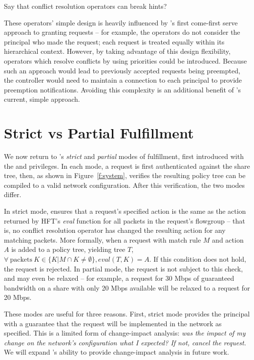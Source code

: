 {\color{red} Say that conflict resolution operators can break hints?}

These operators' simple design is heavily influenced by \sys's
first come-first serve approach to granting requests -- for example,
the operators do not consider the principal who made the request;
each request is treated equally within its hierarchical context.
However, by taking advantage of this design flexibility, operators
which resolve conflicts by using priorities could be introduced.
Because such an approach would lead to previously accepted requests
being preempted, the \sys controller would need to maintain a
connection to each principal to provide preemption notifications.
Avoiding this complexity is an additional benefit of \sys's current,
simple approach.

\section{Strict vs Partial Fulfillment}
\label{sec:strict-partial}

We now return to \sys's \emph{strict} and \emph{partial} modes of
fulfillment, first introduced with the  and 
privileges. In each mode, a request is first authenticated against the
share tree, then, as shown in Figure~\ref{f:system}, \sys verifies the resulting policy tree can be
compiled to a valid network configuration.
After this verification, the two modes differ.

In strict mode, \sys ensures that a request's specified action
is the same as the action returned by HFT's \emph{eval}
function for all packets in the request's flowgroup -- that is, no
conflict resolution operator has changed the resulting action for
any matching packets.
More formally, when a request with match rule $M$ and action
$A$ is added to a policy tree, yielding tree $T$,
$\forall\ \mathrm{packets}\ K \in \{ K | M \cap K \ne \emptyset \}, \mathit{eval} (T, K) = A$.
If this condition does not hold, the request is rejected.
In partial mode, the request is not subject to this check, and may
even be relaxed -- for example, a request for 30 Mbps of guaranteed
bandwidth on a share with only 20 Mbps available will be relaxed
to a request for 20 Mbps. 

These modes are useful for three reasons. First, strict mode provides
the principal with a guarantee that the request will be implemented
in the network as specified. This is a limited form of change-impact
analysis: \emph{was the impact of my change on the network's configuration
what I expected? If not, cancel the request.} We will expand
\sys's ability to provide change-impact analysis in future work.


